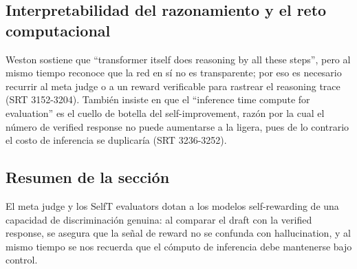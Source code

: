 \subsection{Interpretabilidad del razonamiento y el reto computacional}
Weston sostiene que ``transformer itself does reasoning by all these steps'', pero al mismo tiempo reconoce que la red en sí no es transparente; por eso es necesario recurrir al meta judge o a un reward verificable para rastrear el reasoning trace (SRT 3152-3204). También insiste en que el ``inference time compute for evaluation'' es el cuello de botella del self-improvement, razón por la cual el número de verified response no puede aumentarse a la ligera, pues de lo contrario el costo de inferencia se duplicaría (SRT 3236-3252).

\subsection{Resumen de la sección}
El meta judge y los SelfT evaluators dotan a los modelos self-rewarding de una capacidad de discriminación genuina: al comparar el draft con la verified response, se asegura que la señal de reward no se confunda con hallucination, y al mismo tiempo se nos recuerda que el cómputo de inferencia debe mantenerse bajo control.

